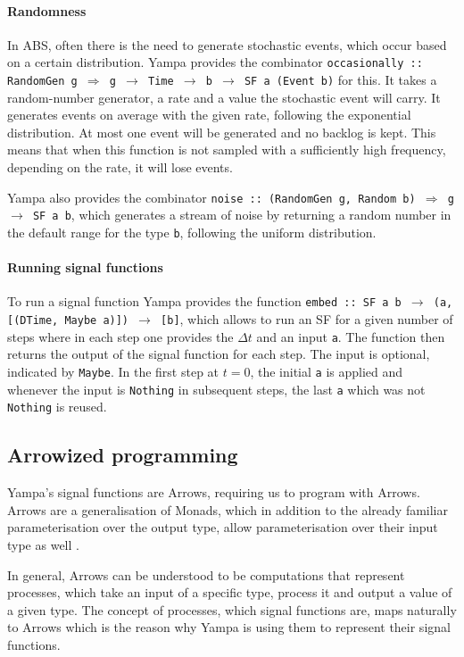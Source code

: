 \paragraph{Randomness}
In ABS, often there is the need to generate stochastic events, which occur based on a certain distribution. Yampa provides the combinator \texttt{occasionally :: RandomGen g $\Rightarrow$ g $\rightarrow$ Time $\rightarrow$ b $\rightarrow$ SF a (Event b)} for this. It takes a random-number generator, a rate and a value the stochastic event will carry. It generates events on average with the given rate, following the exponential distribution. At most one event will be generated and no backlog is kept. This means that when this function is not sampled with a sufficiently high frequency, depending on the rate, it will lose events.

Yampa also provides the combinator \texttt{noise :: (RandomGen g, Random b) $\Rightarrow$ g $\rightarrow$ SF a b}, which generates a stream of noise by returning a random number in the default range for the type \texttt{b}, following the uniform distribution.

\paragraph{Running signal functions}
To run a signal function Yampa provides the function \texttt{embed :: SF a b $\rightarrow$ (a, [(DTime, Maybe a)]) $\rightarrow$ [b]}, which allows to run an SF for a given number of steps where in each step one provides the $\Delta t$ and an input \texttt{a}. The function then returns the output of the signal function for each step. The input is optional, indicated by \texttt{Maybe}. In the first step at $t = 0$, the initial \texttt{a} is applied and whenever the input is \texttt{Nothing} in subsequent steps, the last \texttt{a} which was not \texttt{Nothing} is reused.

\subsection{Arrowized programming}
Yampa's signal functions are Arrows, requiring us to program with Arrows. Arrows are a generalisation of Monads, which in addition to the already familiar parameterisation over the output type, allow parameterisation over their input type as well \cite{hughes_generalising_2000, hughes_programming_2005}.

In general, Arrows can be understood to be computations that represent processes, which take an input of a specific type, process it and output a value of a given type. The concept of processes, which signal functions are, maps naturally to Arrows which is the reason why Yampa is using them to represent their signal functions.

